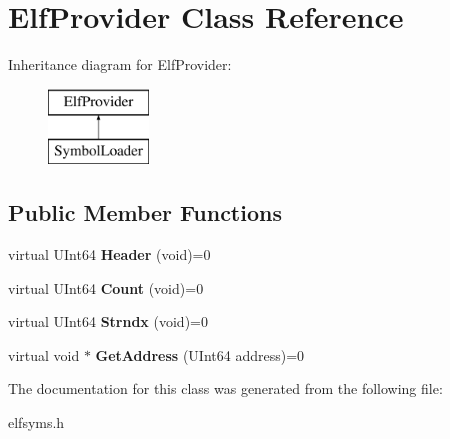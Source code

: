 \hypertarget{class_elf_provider}{}\section{Elf\+Provider Class Reference}
\label{class_elf_provider}
Inheritance diagram for Elf\+Provider\+:\begin{figure}[H]
\begin{center}
\leavevmode
\includegraphics[height=2.000000cm]{class_elf_provider}
\end{center}
\end{figure}
\subsection*{Public Member Functions}
\begin{DoxyCompactItemize}
\item 
\mbox{\label{class_elf_provider_ae757dbfaff68b095dee6685380c3ae8e}} 
virtual U\+Int64 {\bfseries Header} (void)=0
\item 
\mbox{\label{class_elf_provider_a009de9ef2b4a261f7ef531950c165bc1}} 
virtual U\+Int64 {\bfseries Count} (void)=0
\item 
\mbox{\label{class_elf_provider_a1aba51981b249d783ea9cb4a56839927}} 
virtual U\+Int64 {\bfseries Strndx} (void)=0
\item 
\mbox{\label{class_elf_provider_ab92e6abc7309775a3f6bdd356928aeac}} 
virtual void $\ast$ {\bfseries Get\+Address} (U\+Int64 address)=0
\end{DoxyCompactItemize}


The documentation for this class was generated from the following file\+:\begin{DoxyCompactItemize}
\item 
elfsyms.\+h\end{DoxyCompactItemize}
